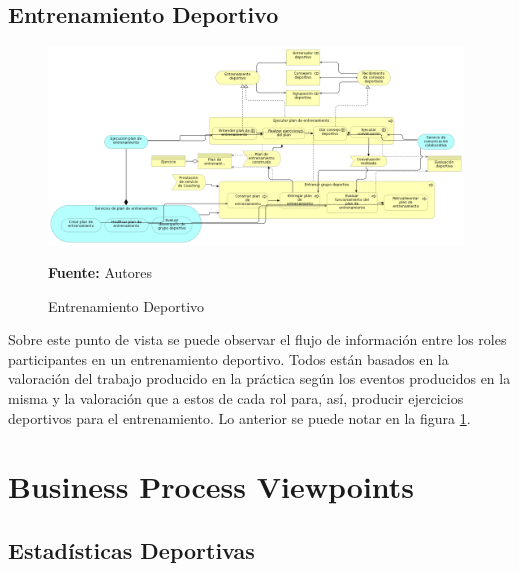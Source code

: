 \subsection{Entrenamiento Deportivo}

\begin{figure}[!htb]
  \begin{center}
    \includegraphics[width=11cm]{./imagenes/Archimate/vistas/business_functions/entrenamientodeportivo.png}
    \caption{Entrenamiento Deportivo}
    \label{fig:bf_entrenamiento_deportivo}
    \textbf{Fuente:}  Autores \\
  \end{center}
\end{figure}

Sobre este punto de vista se puede observar el flujo de información entre los roles participantes en un entrenamiento deportivo. Todos están basados en la valoración del trabajo producido en la práctica según los eventos producidos en la misma y la valoración que a estos de cada rol para, así, producir ejercicios deportivos para el entrenamiento. Lo anterior se puede notar en la figura \ref{fig:bf_entrenamiento_deportivo}.

\section{Business Process Viewpoints}

\subsection{Estadísticas Deportivas}

